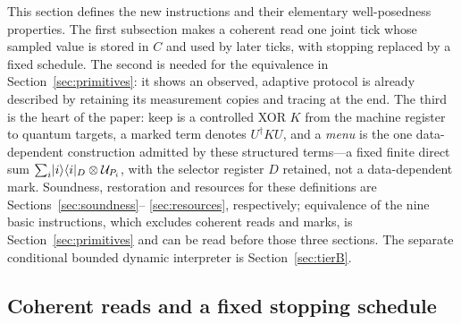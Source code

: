 This section defines the new instructions and their elementary
well-posedness properties. The first subsection makes a coherent read one
joint tick whose sampled value is stored in $C$ and used by later ticks,
with stopping replaced by a fixed schedule. The second is needed for the
equivalence in Section~\ref{sec:primitives}: it shows an observed, adaptive
protocol is already described by retaining its measurement copies and
tracing at the end. The third is the heart of the paper: keep is a
controlled XOR $K$ from the machine register to quantum targets, a marked
term denotes $U^\dagger KU$, and a \emph{menu} is the one data-dependent
construction admitted by these structured terms---a fixed finite direct
sum $\sum_i\lvert i\rangle\langle i\rvert_D\otimes\mathcal U_{P_i}$, with the selector register
$D$ retained, not a data-dependent mark. Soundness, restoration and
resources for these definitions are Sections~\ref{sec:soundness}--%
\ref{sec:resources}, respectively; equivalence of the nine basic
instructions, which excludes coherent reads and marks, is
Section~\ref{sec:primitives} and can be read before those three sections.
The separate conditional bounded dynamic interpreter is
Section~\ref{sec:tierB}.

\subsection{Coherent reads and a fixed stopping schedule}

